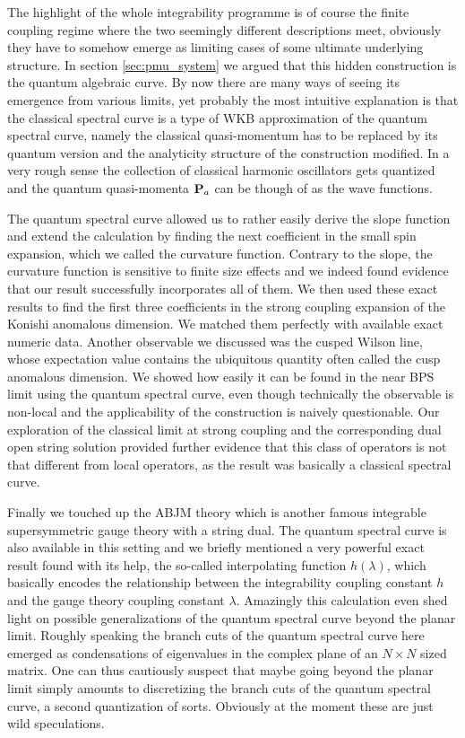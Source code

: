 The highlight of the whole integrability programme is of course the finite coupling regime where the two seemingly different descriptions meet, obviously they have to somehow emerge as limiting cases of some ultimate underlying structure.
In section \ref{sec:pmu_system} we argued that this hidden construction is the quantum algebraic curve. 
By now there are many ways of seeing its emergence from various limits, yet probably the most intuitive explanation is that the classical spectral curve is a type of WKB approximation of the quantum spectral curve, namely the classical quasi-momentum has to be replaced by its quantum version and the analyticity structure of the construction modified.
In a very rough sense the collection of classical harmonic oscillators gets quantized and the quantum quasi-momenta ${\bf P}_a$ can be though of as the wave functions. 

The quantum spectral curve allowed us to rather easily derive the slope function and extend the calculation by finding the next coefficient in the small spin expansion, which we called the curvature function.
Contrary to the slope, the curvature function is sensitive to finite size effects and we indeed found evidence that our result successfully incorporates all of them.
We then used these exact results to find the first three coefficients in the strong coupling expansion of the Konishi anomalous dimension.
We matched them perfectly with available exact numeric data.
Another observable we discussed was the cusped Wilson line, whose expectation value contains the ubiquitous quantity often called the cusp anomalous dimension.
We showed how easily it can be found in the near BPS limit using the quantum spectral curve, even though technically the observable is non-local and the applicability of the construction is naively questionable.
Our exploration of the classical limit at strong coupling and the corresponding dual open string solution provided further evidence that this class of operators is not that different from local operators, as the result was basically a classical spectral curve.

Finally we touched up the ABJM theory which is another famous integrable supersymmetric gauge theory with a string dual.
The quantum spectral curve is also available in this setting and we briefly mentioned a very powerful exact result found with its help, the so-called interpolating function $h(\lambda)$, which basically encodes the relationship between the integrability coupling constant $h$ and the gauge theory coupling constant $\lambda$.
Amazingly this calculation even shed light on possible generalizations of the quantum spectral curve beyond the planar limit.
Roughly speaking the branch cuts of the quantum spectral curve here emerged as condensations of eigenvalues in the complex plane of an $N \times N$ sized matrix.
One can thus cautiously suspect that maybe going beyond the planar limit simply amounts to discretizing the branch cuts of the quantum spectral curve, a second quantization of sorts. 
Obviously at the moment these are just wild speculations.

